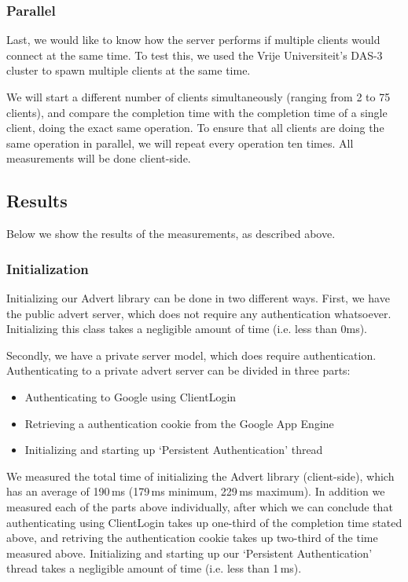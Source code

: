 \subsubsection{Parallel}
Last, we would like to know how the server performs if multiple clients would
connect at the same time. To test this, we used the Vrije Universiteit's DAS-3
cluster to spawn multiple clients at the same time. 

We will start a different number of clients simultaneously (ranging from 2 to 75
clients), and compare the completion time with the completion time of a single
client, doing the exact same operation. To ensure that all clients are doing
the same operation in parallel, we will repeat every operation ten times. All
measurements will be done client-side.

\subsection{Results}
Below we show the results of the measurements, as described above.

\subsubsection{Initialization}
Initializing our Advert library can be done in two different ways. First, we
have the public advert server, which does not require any authentication
whatsoever. Initializing this class takes a negligible amount of time (i.e.
less than 0ms).

Secondly, we have a private server model, which does require authentication.
Authenticating to a private advert server can be divided in three parts:

\begin{itemize}
  \item Authenticating to Google using ClientLogin
  \item Retrieving a authentication cookie from the Google App Engine
  \item Initializing and starting up `Persistent Authentication' thread
\end{itemize}

We measured the total time of initializing the Advert library (client-side),
which has an average of 190\,ms (179\,ms minimum, 229\,ms maximum). In addition
we measured each of the parts above individually, after which we can conclude
that authenticating using ClientLogin takes up one-third of the completion time
stated above, and retriving the authentication cookie takes up two-third of the
time measured above. Initializing and starting up our `Persistent Authentication'
thread takes a negligible amount of time (i.e. less than 1\,ms).

